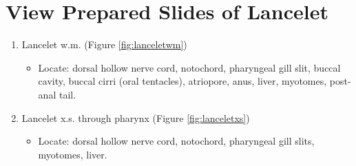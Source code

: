 \documentclass[]{book}
\providecommand{\tightlist}{%
  \setlength{\itemsep}{0pt}\setlength{\parskip}{0pt}}
\begin{document}
\hypertarget{view-prepared-slides-of-lancelet}{%
\section{View Prepared Slides of Lancelet}\label{view-prepared-slides-of-lancelet}}

\begin{enumerate}
\def\labelenumi{\arabic{enumi}.}
\tightlist
\item
  Lancelet w.m. (Figure \ref{fig:lanceletwm})

  \begin{itemize}
  \tightlist
  \item
    Locate: dorsal hollow nerve cord, notochord, pharyngeal gill slit, buccal cavity, buccal cirri (oral tentacles), atriopore, anus, liver, myotomes, post-anal tail.
  \end{itemize}
\item
  Lancelet x.s. through pharynx (Figure \ref{fig:lanceletxs})

  \begin{itemize}
  \tightlist
  \item
    Locate: dorsal hollow nerve cord, notochord, pharyngeal gill slits, myotomes, liver.
  \end{itemize}
\end{enumerate}
\end{document}
